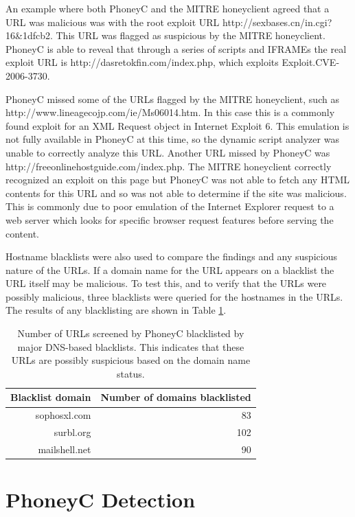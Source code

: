 \documentclass[10pt,twocolumn]{article}
\begin{document}
An example where both PhoneyC and the MITRE honeyclient agreed that a URL was malicious was with the root exploit URL http://sexbases.cn/in.cgi?16\&1dfcb2. This URL was flagged as suspicious by the MITRE honeyclient. PhoneyC is able to reveal that through a series of scripts and IFRAMEs the real exploit URL is http://dasretokfin.com/index.php, which exploits Exploit.CVE-2006-3730. 

PhoneyC missed some of the URLs flagged by the MITRE honeyclient, such as http://www.lineagecojp.com/ie/Ms06014.htm. In this case this is a commonly found exploit for an XML Request object in Internet Exploit 6. This emulation is not fully available in PhoneyC at this time, so the dynamic script analyzer was unable to correctly analyze this URL. Another URL missed by PhoneyC was http://freeonlinehostguide.com/index.php. The MITRE honeyclient correctly recognized an exploit on this page but PhoneyC was not able to fetch any HTML contents for this URL and so was not able to determine if the site was malicious. This is commonly due to poor emulation of the Internet Explorer request to a web server which looks for specific browser request features before serving the content. 

Hostname blacklists were also used to compare the findings and any suspicious nature of the URLs. If a domain name for the URL appears on a blacklist the URL itself may be malicious. To test this, and to verify that the URLs were possibly malicious, three blacklists were queried for the hostnames in the URLs. The results of any blacklisting are shown in Table \ref{blacklist}. 

\begin{table}
\centering
\begin{tabular}{r|r}
\hline
{\bf Blacklist domain} & {Number of domains blacklisted} \\
\hline
sophosxl.com & 83 \\
surbl.org & 102 \\
mailshell.net & 90 \\ 
\hline
\end{tabular}
\bigskip
\scriptsize
\caption{Number of URLs screened by PhoneyC blacklisted by major DNS-based blacklists. This indicates that these URLs are possibly suspicious based on the domain name status.}
\normalsize
\bigskip
\label{blacklist}
\end{table}
\section{PhoneyC Detection}
\label{weaknesses}
\end{document}
